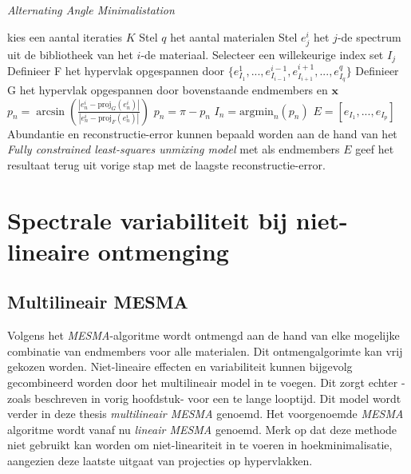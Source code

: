 \documentclass[12pt]{report}
\newcommand{\proj}[2]{\text{proj}_{#2}\left(#1\right)}
\begin{document}
\begin{algorithm}
\caption{\textit{Alternating Angle Minimalistation} \label{al:AAM}}
\begin{algorithmic}[1]
\State kies een aantal iteraties $K$
\State Stel $q$ het aantal materialen
\State Stel $e_j^i$ het $j$-de spectrum uit de bibliotheek van het $i$-de materiaal.
\State Selecteer een willekeurige index set $I_j$
\State Definieer F het hypervlak opgespannen door $\{e^1_{I_1},...,e^{i-1}_{I_{i-1}},e^{i+1}_{I_{i+1}},...,e^q_{I_q}\}$
\State Definieer G het hypervlak opgespannen door bovenstaande endmembers en $\bm{x}$
\State $p_n = \arcsin \left(\frac{\left|e^i_n - \proj{e^i_n}{G}\right|}{\left|e^i_n - \proj{e^i_n}{F}\right|}\right)$
\If {$(e^i_n - \proj{e^i_n}{F}) \dot (x - proj{x}{F}) < 0$}
\State $p_n = \pi - p_n$
\EndIf
\EndFor
\EndFor
\State $I_n = \text{argmin}_n\left(p_n\right)$
\EndFor
\State $E = [e_{I_1},...,e_{I_p}]$
\State Abundantie en reconstructie-error kunnen bepaald worden aan de hand van het \textit{Fully constrained
least-squares unmixing model} met als endmembers $E$
\EndFor
\State geef het resultaat terug uit vorige stap met de laagste reconstructie-error.
\end{algorithmic}
\end{algorithm}


\chapter{Spectrale variabiliteit bij niet-lineaire ontmenging}

\section{Multilineair MESMA} \label{sec:mmesma}

Volgens het \textit{MESMA}-algoritme wordt ontmengd aan de hand van elke mogelijke combinatie van endmembers voor alle materialen. Dit ontmengalgorimte kan vrij gekozen worden. Niet-lineaire effecten en variabiliteit kunnen bijgevolg gecombineerd worden door het multilineair model in te voegen. Dit zorgt echter -zoals beschreven in vorig hoofdstuk- voor een te lange looptijd. Dit model wordt verder in deze thesis \textit{multilineair MESMA} genoemd. Het voorgenoemde \textit{MESMA} algoritme wordt vanaf nu \textit{lineair MESMA} genoemd. Merk op dat deze methode niet gebruikt kan worden om niet-lineariteit in te voeren in hoekminimalisatie, aangezien deze laatste uitgaat van projecties op hypervlakken.
\end{document}
